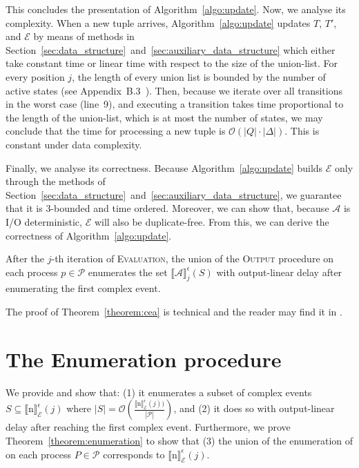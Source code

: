 This concludes the presentation of Algorithm~\ref{algo:update}. Now, we analyse its complexity. When a new tuple arrives, Algorithm~\ref{algo:update} updates $T$, $T'$, and $\mathcal{E}$ by means of methods in Section~\ref{sec:data_structure}~and~\ref{sec:auxiliary_data_structure} which either take constant time or linear time with respect to the size of the union-list. For every position $j$, the length of every union list is bounded by the number of active states (see Appendix~B.3~\cite{core}). Then, because we iterate over all transitions in the worst case (line~9), and executing a transition takes time proportional to the length of the union-list, which is at most the number of states, we may conclude that the time for processing a new tuple is $\mathcal{O}(|Q| \cdot |\Delta|)$. This is constant under data complexity.

Finally, we analyse its correctness. Because Algorithm~\ref{algo:update} builds $\mathcal{E}$ only through the methods of Section~\ref{sec:data_structure}~and~\ref{sec:auxiliary_data_structure}, we guarantee that it is $3$-bounded and time ordered. Moreover, we can show that, because $\mathcal{A}$ is I/O deterministic, $\mathcal{E}$ will also be duplicate-free. From this, we can derive the correctness of Algorithm~\ref{algo:update}.

\begin{theorem}\label{theorem:cea}
  After the $j$-th iteration of \textsc{Evaluation}, the union of the \textsc{Output} procedure on each process $p \in \mathcal{P}$ enumerates the set ${\llbracket \mathcal{A} \rrbracket}^{\epsilon}_{j}(S)$ with output-linear delay after enumerating the first complex event.
\end{theorem}

The proof of Theorem~\ref{theorem:cea} is technical and the reader may find it in \cite{core}.

\section{The Enumeration procedure}\label{sec:enumeration}

We provide  and show that: (1) it enumerates a subset of complex events $S \subseteq {\llbracket \text{n} \rrbracket}^{\epsilon}_{\mathcal{E}}(j)$ where $|S| = \mathcal{O}(\frac{{\llbracket \text{n} \rrbracket}^{\epsilon}_{\mathcal{E}}(j))}{|\mathcal{P}|})$, and (2) it does so with output-linear delay after reaching the first complex event. Furthermore, we prove Theorem~\ref{theorem:enumeration} to show that (3) the union of the enumeration of  on each process $P \in \mathcal{P}$ corresponds to ${\llbracket \text{n} \rrbracket}^{\epsilon}_{\mathcal{E}}(j)$.

